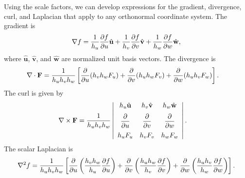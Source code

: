 Using the scale factors, we can develop expressions for the gradient, divergence, curl, and Laplacian that apply to any orthonormal coordinate system. The gradient is
\begin{align}
  \nabla f = \frac{1}{h_u} \frac{ \partial {f} }{ \partial {u} } \hat{\mathbf{u}} + \frac{1}{h_v} \frac{ \partial {f} }{ \partial {v} } \hat{\mathbf{v}} + \frac{1}{h_w} \frac{ \partial {f} }{ \partial {w} } \hat{\mathbf{w}},
\end{align}
where $\hat{\mathbf{u}}$, $\hat{\mathbf{v}}$, and $\hat{\mathbf{w}}$ are normalized unit basis vectors. The divergence is
\begin{align}
  \nabla \cdot \mathbf{F} &= \frac{1}{h_u h_v h_w} \left[ \frac{ \partial {} }{ \partial {u} }( h_v h_w F_u ) +  \frac{ \partial {} }{ \partial {v} }( h_u h_w F_v ) + \frac{ \partial {} }{ \partial {w} } ( h_u h_v F_w ) \right] .
\end{align}
The curl is given by
\begin{align}
  \nabla \times \mathbf{F} &= \frac{1}{h_u h_v h_w}
  \left| \begin{array}{c c c}
  h_u \uhat & h_v \vhat & h_w \what \vspace{0.2cm} \\
  \dfrac{\partial}{\partial u} & \dfrac{\partial}{\partial v} & \dfrac{\partial}{\partial w} \vspace{0.2cm}  \\
  h_u F_u   & h_v F_v   & h_w F_w   \\ \end{array} \right| .
\end{align}
The scalar Laplacian is
\begin{align}
  \nabla^2 f = \frac{1}{h_u h_v h_w} 
    \left[ \frac{ \partial {} }{ \partial {u} } \left( \frac{h_v h_w}{h_u} \frac{ \partial {f} }{ \partial {u} } \right) 
         + \frac{ \partial {} }{ \partial {v} } \left( \frac{h_u h_w}{h_v} \frac{ \partial {f} }{ \partial {v} } \right) 
         + \frac{ \partial {} }{ \partial {w} } \left( \frac{h_u h_v}{h_w} \frac{ \partial {f} }{ \partial {w} } \right) \right] .
\end{align}

